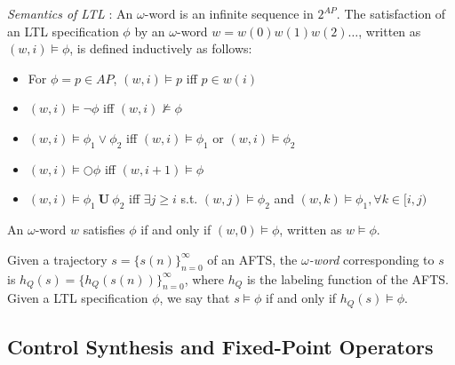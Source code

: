 {\color{teal}\emph{Semantics of LTL} \cite{Nilsson2017}:} An $\omega$-word is an infinite sequence in $ 2^{AP}$.  The satisfaction of an LTL specification $ \phi $ by an $\omega$-word $ w = w(0)w(1)w(2)\dots $, written as $ (w,i) \models \phi $, is defined inductively as follows:
\begin{itemize}
	\item For $ \phi = p \in AP $, $ (w,i)\models p $ iff $ p\in w(i) $ 
	\item $ (w,i)\models \neg \phi $ iff $ (w,i)\not\models \phi $
	\item $ (w,i)\models  \phi_1 \vee \phi_2 $ iff $ (w,i)\models \phi_1 $ or $ (w,i)\models \phi_2 $
	\item $ (w,i) \models \bigcirc \phi $ iff $ (w,i+1) \models \phi $
	\item $ (w,i)\models \phi_1 \mathbf{\ U\ } \phi_2 $ iff $\exists j\geq i  $ s.t. $ (w,j)\models \phi_2 $ and $ (w,k)\models \phi_1, \forall k\in [i,j) $
\end{itemize} 

An $\omega$-word $ w $ satisfies $ \phi $ if and only if $ (w,0)\models \phi $, written as $ w \models \phi $. 


Given a trajectory $ s = \{s(n)\}_{n=0}^{\infty} $ of an AFTS, the \textit{$\omega$-word} corresponding to $ s $ is $ h_Q(s) =  \{h_Q(s(n))\}_{n=0}^{\infty} $, where $ h_Q $ is the labeling function of the AFTS.  Given a LTL specification $ \phi $, we say that $ s\models \phi $ if and only if $ h_Q(s) \models \phi $.

\subsection{Control Synthesis and Fixed-Point Operators}
\label{sec: cont_syn}

